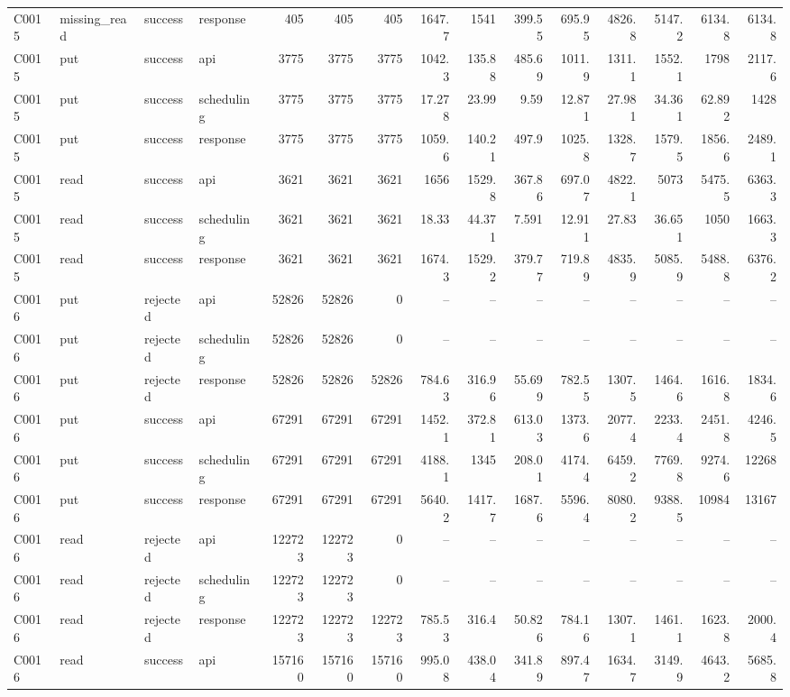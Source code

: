 \begin{landscape}
\begin{longtable}{llllrrrrrrrrrrr}
C0015 & missing\_\allowbreak{}read & success & response & 405 & 405 & 405 & 1647.7 & 1541 & 399.55 & 695.95 & 4826.8 & 5147.2 & 6134.8 & 6134.8\\
C0015 & put & success & api & 3775 & 3775 & 3775 & 1042.3 & 135.88 & 485.69 & 1011.9 & 1311.1 & 1552.1 & 1798 & 2117.6\\
C0015 & put & success & scheduling & 3775 & 3775 & 3775 & 17.278 & 23.99 & 9.59 & 12.871 & 27.981 & 34.361 & 62.892 & 1428\\
C0015 & put & success & response & 3775 & 3775 & 3775 & 1059.6 & 140.21 & 497.9 & 1025.8 & 1328.7 & 1579.5 & 1856.6 & 2489.1\\
C0015 & read & success & api & 3621 & 3621 & 3621 & 1656 & 1529.8 & 367.86 & 697.07 & 4822.1 & 5073 & 5475.5 & 6363.3\\
C0015 & read & success & scheduling & 3621 & 3621 & 3621 & 18.33 & 44.371 & 7.591 & 12.911 & 27.83 & 36.651 & 1050 & 1663.3\\
C0015 & read & success & response & 3621 & 3621 & 3621 & 1674.3 & 1529.2 & 379.77 & 719.89 & 4835.9 & 5085.9 & 5488.8 & 6376.2\\
C0016 & put & rejected & api & 52826 & 52826 & 0 & -- & -- & -- & -- & -- & -- & -- & --\\
C0016 & put & rejected & scheduling & 52826 & 52826 & 0 & -- & -- & -- & -- & -- & -- & -- & --\\
C0016 & put & rejected & response & 52826 & 52826 & 52826 & 784.63 & 316.96 & 55.699 & 782.55 & 1307.5 & 1464.6 & 1616.8 & 1834.6\\
C0016 & put & success & api & 67291 & 67291 & 67291 & 1452.1 & 372.81 & 613.03 & 1373.6 & 2077.4 & 2233.4 & 2451.8 & 4246.5\\
C0016 & put & success & scheduling & 67291 & 67291 & 67291 & 4188.1 & 1345 & 208.01 & 4174.4 & 6459.2 & 7769.8 & 9274.6 & 12268\\
C0016 & put & success & response & 67291 & 67291 & 67291 & 5640.2 & 1417.7 & 1687.6 & 5596.4 & 8080.2 & 9388.5 & 10984 & 13167\\
C0016 & read & rejected & api & 122723 & 122723 & 0 & -- & -- & -- & -- & -- & -- & -- & --\\
C0016 & read & rejected & scheduling & 122723 & 122723 & 0 & -- & -- & -- & -- & -- & -- & -- & --\\
C0016 & read & rejected & response & 122723 & 122723 & 122723 & 785.53 & 316.4 & 50.826 & 784.16 & 1307.1 & 1461.1 & 1623.8 & 2000.4\\
C0016 & read & success & api & 157160 & 157160 & 157160 & 995.08 & 438.04 & 341.89 & 897.47 & 1634.7 & 3149.9 & 4643.2 & 5685.8\\

\end{longtable}
\end{landscape}
